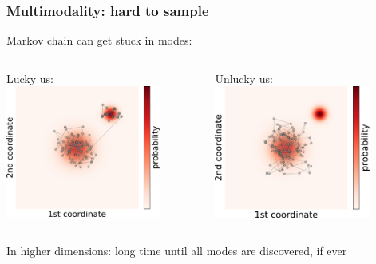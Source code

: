 \documentclass[t,aspectratio=169]{beamer}
\begin{document}
\begin{frame}
  \frametitle{Multimodality: hard to sample}
  Markov chain can get stuck in modes:
  \bigskip
  \begin{columns}
    \begin{column}{0.4\textwidth}
      Lucky us:\\
      \includegraphics[width=0.8\textwidth]{images/dist_2d_chain}
    \end{column}
    \begin{column}{0.4\textwidth}
      Unlucky us:\\
      \includegraphics[width=0.8\textwidth]{images/dists_2d_chain_stuck}
    \end{column}
  \end{columns}
  \bigskip
  In higher dimensions: long time until all modes are discovered, if ever
\end{frame}
\end{document}
